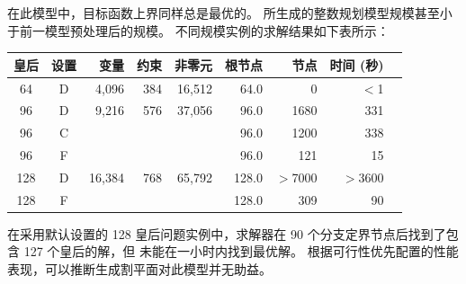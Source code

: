 \medskip
\noindent 在此模型中，目标函数上界同样总是最优的。
所生成的整数规划模型规模甚至小于前一模型预处理后的规模。
不同规模实例的求解结果如下表所示：
\begin{center}
{\sffamily\small
\begin{tabular}{ccrrrrrrr}
\toprule
皇后 & 设置 & 变量 & 约束 & 非零元 & 根节点 & 节点 & 时间 (秒) \\
\midrule
  64   & D &  4,096 &     384 &    16,512 &  64.0 &     0 & $<$1\\
  96   & D &  9,216 &     576 &    37,056 &  96.0 &  1680 & 331\\
  96   & C &        &         &           &  96.0 &  1200 & 338\\
  96   & F &        &         &           &  96.0 &   121 &  15\\
 128   & D & 16,384 &     768 &    65,792 & 128.0 & $>$7000 &$>$3600 &\\
 128   & F &        &         &           & 128.0 &   309 &  90\\
\bottomrule
\end{tabular}
}
\end{center}
在采用默认设置的 128 皇后问题实例中，求解器在 90 个分支定界节点后找到了包含 
127 个皇后的解，但 \cplex 未能在一小时内找到最优解。
根据可行性优先配置的性能表现，可以推断生成割平面对此模型并无助益。


